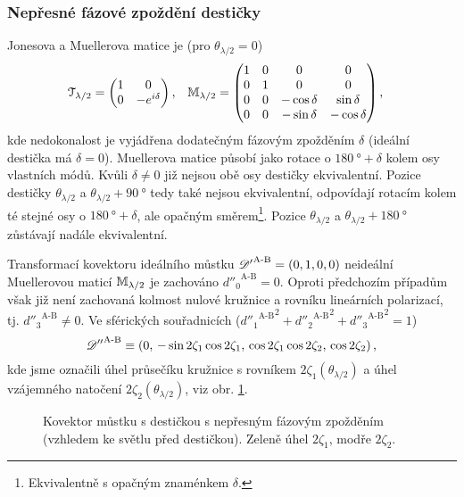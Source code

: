 \subsubsection*{Nepřesné fázové zpoždění destičky}
Jonesova a Muellerova matice je (pro $\theta_{\lambda/2}=0$)
\begin{align}
    \mathcal{T}_{\lambda/2} &= \begin{pmatrix} 1&0 \\ 0&-e^{i\delta} \end{pmatrix} , &
    \mathbb{M}_{\lambda/2} &= \begin{pmatrix} 1&0&0&0 \\ 0&1&0&0 \\ 0&0&-\cos\delta&\sin\delta \\ 0&0&-\sin\delta&-\cos\delta \end{pmatrix} ,
\end{align}
kde nedokonalost je vyjádřena dodatečným fázovým zpožděním $\delta$ (ideální destička má $\delta=0$).
Muellerova matice působí jako rotace o $\SI{180}{\degree}+\delta$ kolem osy vlastních módů.
Kvůli $\delta\neq0$ již nejsou obě osy destičky ekvivalentní.
Pozice destičky $\theta_{\lambda/2}$ a $\theta_{\lambda/2}+\SI{90}{\degree}$ tedy také nejsou ekvivalentní, odpovídají rotacím kolem té stejné osy o $\SI{180}{\degree}+\delta$, ale opačným směrem\footnote{Ekvivalentně s opačným znaménkem $\delta$.}.
Pozice $\theta_{\lambda/2}$ a $\theta_{\lambda/2}+\SI{180}{\degree}$ zůstávají nadále ekvivalentní.

Transformací kovektoru ideálního můstku ${\mathscr{D}'}^\textrm{A-B}=(0, 1, 0, 0)$ neideální Muellerovou maticí $\mathbb{M}_{\lambda/2}$ je zachováno ${d''_0}^\textrm{A-B}=0$.
Oproti předchozím případům však již není zachovaná kolmost nulové kružnice a rovníku lineárních polarizací, tj. ${d''_3}^\textrm{A-B}\neq0$.
Ve sférických souřadnicích (${{d''_1}^\textrm{A-B}}^2+{{d''_2}^\textrm{A-B}}^2+{{d''_3}^\textrm{A-B}}^2=1$)
\begin{equation}
    {\mathscr{D}''}^\textrm{A-B} \equiv (0,\, -\sin2\zeta_1\cos2\zeta_1,\, \cos2\zeta_1\cos2\zeta_2,\, \cos2\zeta_2) \,,
\end{equation}
kde jsme označili úhel průsečíku kružnice s rovníkem $2\zeta_1(\theta_{\lambda/2})$ a úhel vzájemného natočení $2\zeta_2(\theta_{\lambda/2})$, viz obr. \ref{fig:mustek-nedokonale-desticka}.

\begin{figure}[htbp]
    \centering
    
    \caption{Kovektor můstku s destičkou s nepřesným fázovým zpožděním (vzhledem ke světlu před destičkou). Zeleně úhel $2\zeta_1$, modře $2\zeta_2$.}
    \label{fig:mustek-nedokonale-desticka}
\end{figure}

